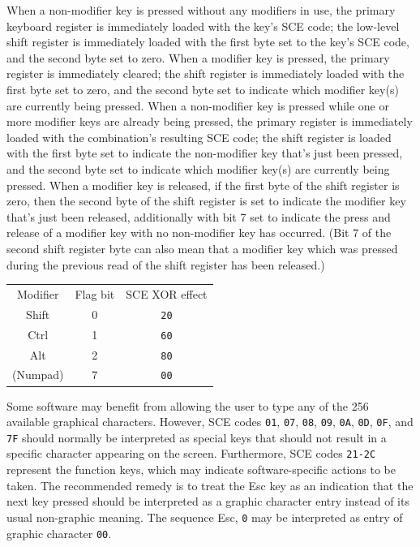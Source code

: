 \documentclass[12pt]{{memoir}}
\begin{document}
When a non-modifier key is pressed without any modifiers in use, the primary keyboard register is immediately loaded with the key's SCE code; the low-level shift register is immediately loaded with the first byte set to the key's SCE code, and the second byte set to zero. When a modifier key is pressed, the primary register is immediately cleared; the shift register is immediately loaded with the first byte set to zero, and the second byte set to indicate which modifier key(s) are currently being pressed. When a non-modifier key is pressed while one or more modifier keys are already being pressed, the primary register is immediately loaded with the combination's resulting SCE code; the shift register is loaded with the first byte set to indicate the non-modifier key that's just been pressed, and the second byte set to indicate which modifier key(s) are currently being pressed. When a modifier key is released, if the first byte of the shift register is zero, then the second byte of the shift register is set to indicate the modifier key that's just been released, additionally with bit 7 set to indicate the press and release of a modifier key with no non-modifier key has occurred. (Bit 7 of the second shift register byte can also mean that a modifier key which was pressed during the previous read of the shift register has been released.)

\begin{center}\begin{tabular}{ccc}
Modifier & Flag bit & SCE XOR effect \\
\textsf{Shift} & 0 & \texttt{20} \\
\textsf{Ctrl} & 1 & \texttt{60} \\
\textsf{Alt} & 2 & \texttt{80} \\
(Numpad) & 7 & \texttt{00} \\
\end{tabular}\end{center}

Some software may benefit from allowing the user to type any of the 256 available graphical characters. However, SCE codes \texttt{01}, \texttt{07}, \texttt{08}, \texttt{09}, \texttt{0A}, \texttt{0D}, \texttt{0F}, and \texttt{7F} should normally be interpreted as special keys that should not result in a specific character appearing on the screen. Furthermore, SCE codes \texttt{21-2C} represent the function keys, which may indicate software-specific actions to be taken. The recommended remedy is to treat the \textsf{Esc} key as an indication that the next key pressed should be interpreted as a graphic character entry instead of its usual non-graphic meaning. The sequence \textsf{Esc}, \texttt{0} may be interpreted as entry of graphic character \texttt{00}.
\end{document}
